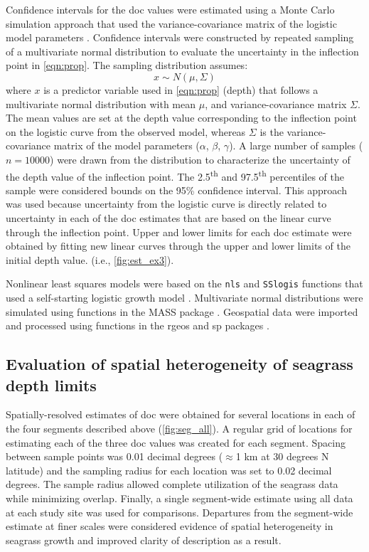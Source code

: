 \documentclass[letterpaper,12pt,oneside]{article}\usepackage[]{graphicx}\usepackage[]{color}
\begin{document}
Confidence intervals for the \ac{doc} values were estimated using a Monte Carlo simulation approach that used the variance-covariance matrix of the logistic model parameters \citep{Hilborn97}.  Confidence intervals were constructed by repeated sampling of a multivariate normal distribution to evaluate the uncertainty in the inflection point in \cref{eqn:prop}.  The sampling distribution assumes:
\begin{equation}
x \sim N(\mu, \Sigma)
\end{equation}
\noindent where $x$ is a predictor variable used in \cref{eqn:prop} (depth) that follows a multivariate normal distribution with mean $\mu$, and variance-covariance matrix $\Sigma$.  The mean values are set at the depth value corresponding to the inflection point on the logistic curve from the observed model, whereas $\Sigma$ is the variance-covariance matrix of the model parameters ($\alpha$, $\beta$, $\gamma$).  A large number of samples ($n = 10000$) were drawn from the distribution to characterize the uncertainty of the depth value of the inflection point.  The 2.5\textsuperscript{th} and 97.5\textsuperscript{th} percentiles of the sample were considered bounds on the 95\% confidence interval.  This approach was used because uncertainty from the logistic curve is directly related to uncertainty in each of the \ac{doc} estimates that are based on the linear curve through the inflection point. Upper and lower limits for each \ac{doc} estimate were obtained by fitting new linear curves through the upper and lower limits of the initial depth value. (i.e., \cref{fig:est_ex3}).

Nonlinear least squares models were based on the \texttt{nls} and \texttt{SSlogis} functions that used a self-starting logistic growth model \citep{Bates92,RDCT14}.  Multivariate normal distributions were simulated using functions in the MASS package \citep{Venables02}.  Geospatial data were imported and processed using functions in the rgeos and sp packages \citep{Bivand08,Bivand14}.  

\subsection{Evaluation of spatial heterogeneity of seagrass depth limits}

Spatially-resolved estimates of \ac{doc} were obtained for several locations in each of the four segments described above (\cref{fig:seg_all}).  A regular grid of locations for estimating each of the three \ac{doc} values was created for each segment.  Spacing between sample points was 0.01 decimal degrees ($\approx$1 km at 30 degrees N latitude) and the sampling radius for each location was set to 0.02 decimal degrees.  The sample radius allowed complete utilization of the seagrass data while minimizing overlap.  Finally, a single segment-wide estimate using all data at each study site was used for comparisons.  Departures from the segment-wide estimate at finer scales were considered evidence of spatial heterogeneity in seagrass growth and improved clarity of description as a result.  
\end{document}
